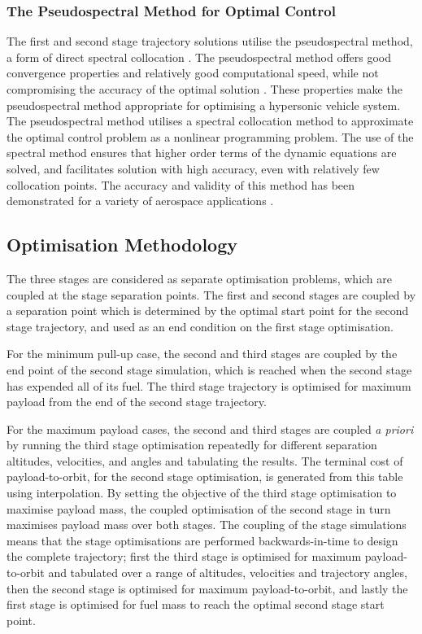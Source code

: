 \documentclass[]{aiaa-tc}
\begin{document}
\subsubsection{The Pseudospectral Method for Optimal Control}
The first and second stage trajectory solutions utilise the pseudospectral method, a form of direct spectral collocation \cite{Fahroo2000}. The pseudospectral method offers good convergence properties and relatively good computational speed, while not compromising the accuracy of the optimal solution \cite{Fasano2013}. These properties make the pseudospectral method appropriate for optimising a hypersonic vehicle system. 
The pseudospectral method utilises a spectral collocation method to approximate the optimal control problem as a nonlinear programming problem. The use of the spectral method ensures that higher order terms of the dynamic equations are solved, and facilitates solution with high accuracy, even with relatively few collocation points\cite{Fahroo1999}. The accuracy and validity of this method has been demonstrated for a variety of aerospace applications \cite{Bedrossian,Huntington2008,Josselyn2002,Yan2007}. 

\subsection{Optimisation Methodology}
	 The three stages are considered as separate optimisation problems, which are coupled at the stage separation points.  
	 The first and second stages are coupled by a separation point which is determined by the optimal start point for the second stage trajectory, and used as an end condition on the first stage optimisation.
	 
	 For the minimum pull-up case, the second and third stages are coupled by the end point of the second stage simulation, which is reached when the second stage has expended all of its fuel. The third stage trajectory is optimised for maximum payload from the end of the second stage trajectory.
	 
	 For the maximum payload cases, the second and third stages are coupled \textit{a priori} by running the third stage optimisation repeatedly for different separation altitudes, velocities, and angles and tabulating the results. The terminal cost of payload-to-orbit, for the second stage optimisation, is generated from this table using interpolation. By setting the objective of the third stage optimisation to maximise payload mass, the coupled optimisation of the second stage in turn maximises payload mass over both stages. 
	 The coupling of the stage simulations means that the stage optimisations are performed backwards-in-time to design the complete trajectory; first the third stage is optimised for maximum payload-to-orbit and tabulated over a range of altitudes, velocities and trajectory angles, then the second stage is optimised for maximum payload-to-orbit, and lastly the first stage is optimised for fuel mass to reach the optimal second stage start point. 
	 
\end{document}
